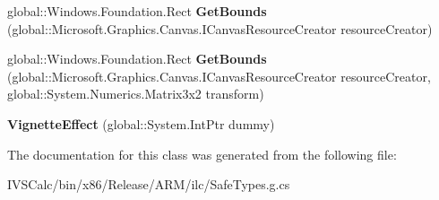 \begin{DoxyCompactItemize}
\mbox{\label{class_microsoft_1_1_graphics_1_1_canvas_1_1_effects_1_1_vignette_effect_af51b08a59d366ec46f8f8cd729c45b98}} 
global\+::\+Windows.\+Foundation.\+Rect {\bfseries Get\+Bounds} (global\+::\+Microsoft.\+Graphics.\+Canvas.\+I\+Canvas\+Resource\+Creator resource\+Creator)
\item 
\mbox{\label{class_microsoft_1_1_graphics_1_1_canvas_1_1_effects_1_1_vignette_effect_afa665f684b9b46082ac4bc19cf044be3}} 
global\+::\+Windows.\+Foundation.\+Rect {\bfseries Get\+Bounds} (global\+::\+Microsoft.\+Graphics.\+Canvas.\+I\+Canvas\+Resource\+Creator resource\+Creator, global\+::\+System.\+Numerics.\+Matrix3x2 transform)
\item 
\mbox{\label{class_microsoft_1_1_graphics_1_1_canvas_1_1_effects_1_1_vignette_effect_ae769910619bfea37cb3260c684934e3d}} 
{\bfseries Vignette\+Effect} (global\+::\+System.\+Int\+Ptr dummy)
\end{DoxyCompactItemize}


The documentation for this class was generated from the following file\+:\begin{DoxyCompactItemize}
\item 
I\+V\+S\+Calc/bin/x86/\+Release/\+A\+R\+M/ilc/Safe\+Types.\+g.\+cs\end{DoxyCompactItemize}
